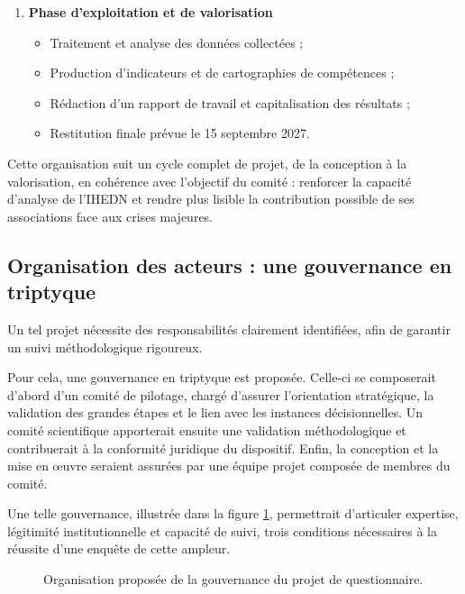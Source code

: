 \documentclass[12pt,a4paper]{article}
\begin{document}
\begin{enumerate}
\clearpage

    \item \textbf{Phase d'exploitation et de valorisation}
    \begin{itemize}
        \item Traitement et analyse des données collectées ;
        \item Production d'indicateurs et de cartographies de compétences ;
        \item Rédaction d'un rapport de travail et capitalisation des résultats ;
        \item Restitution finale prévue le 15 septembre 2027.
    \end{itemize}
\end{enumerate}

Cette organisation suit un cycle complet de projet, de la conception à la valorisation, en cohérence avec l'objectif du comité : renforcer la capacité d'analyse de l'IHEDN et rendre plus lisible la contribution possible de ses associations face aux crises majeures.

\clearpage

\subsection{Organisation des acteurs : une gouvernance en triptyque}

Un tel projet nécessite des responsabilités clairement identifiées, afin de garantir un suivi méthodologique rigoureux.

Pour cela, une gouvernance en triptyque est proposée. Celle-ci se composerait d'abord d'un comité de pilotage, chargé d'assurer l'orientation stratégique, la validation des grandes étapes et le lien avec les instances décisionnelles. Un comité scientifique apporterait ensuite une validation méthodologique et contribuerait à la conformité juridique du dispositif. Enfin, la conception et la mise en \oe{}uvre seraient assurées par une équipe projet composée de membres du comité.

Une telle gouvernance, illustrée dans la figure \ref{fig:gouvernance-triptyque}, permettrait d'articuler expertise, légitimité institutionnelle et capacité de suivi, trois conditions nécessaires à la réussite d'une enquête de cette ampleur.

\begin{figure}[H]
\centering
\scalebox{1.5}{%

}
\caption{Organisation proposée de la gouvernance du projet de questionnaire.}
\label{fig:gouvernance-triptyque}
\end{figure}
\end{document}
